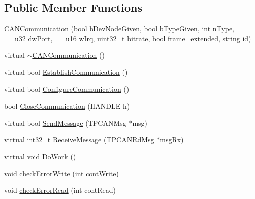 \subsection*{\-Public \-Member \-Functions}
\begin{DoxyCompactItemize}
\item 
\hyperlink{class_c_a_n_communication_ab46dea9c6aacfc3f42361fb458516994}{\-C\-A\-N\-Communication} (bool b\-Dev\-Node\-Given, bool b\-Type\-Given, int n\-Type, \-\_\-\-\_\-u32 dw\-Port, \-\_\-\-\_\-u16 w\-Irq, uint32\-\_\-t bitrate, bool frame\-\_\-extended, string id)
\item 
virtual \hyperlink{class_c_a_n_communication_a1b40a02c0dd8258057d82baf3e8d89be}{$\sim$\-C\-A\-N\-Communication} ()
\item 
virtual bool \hyperlink{class_c_a_n_communication_a548e870616f22b44371eeacac54ec6df}{\-Establish\-Communication} ()
\item 
virtual bool \hyperlink{class_c_a_n_communication_a839851aece22498ef3ab4e807274387b}{\-Configure\-Communication} ()
\item 
bool \hyperlink{class_c_a_n_communication_afb8e85f852dba8f14884b2c988626fed}{\-Close\-Communication} (\-H\-A\-N\-D\-L\-E h)
\item 
virtual bool \hyperlink{class_c_a_n_communication_ada21a063037449022aa654bedb87c522}{\-Send\-Message} (\-T\-P\-C\-A\-N\-Msg $\ast$msg)
\item 
virtual int32\-\_\-t \hyperlink{class_c_a_n_communication_ac3746cec3589757fa7ef73f214801204}{\-Receive\-Message} (\-T\-P\-C\-A\-N\-Rd\-Msg $\ast$msg\-Rx)
\item 
virtual void \hyperlink{class_c_a_n_communication_a8265d49768bb020c101b661b7b36076a}{\-Do\-Work} ()
\item 
void \hyperlink{class_c_a_n_communication_a6221dfb0c7221e7baee07d167ddc2960}{check\-Error\-Write} (int cont\-Write)
\item 
void \hyperlink{class_c_a_n_communication_ac09a44e26ad196ade61428268dee71a0}{check\-Error\-Read} (int cont\-Read)
\end{DoxyCompactItemize}
